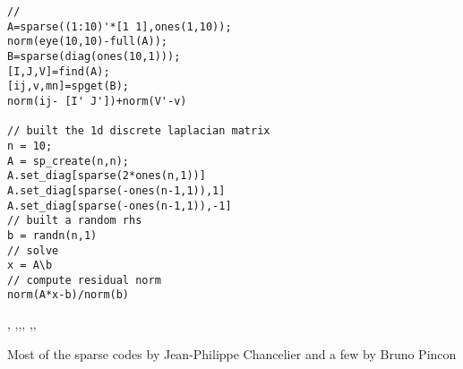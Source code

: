 \begin{examples}
\begin{Verbatim}
//
A=sparse((1:10)'*[1 1],ones(1,10));
norm(eye(10,10)-full(A));
B=sparse(diag(ones(10,1)));
[I,J,V]=find(A);
[ij,v,mn]=spget(B);
norm(ij- [I' J'])+norm(V'-v)

// built the 1d discrete laplacian matrix
n = 10;
A = sp_create(n,n);
A.set_diag[sparse(2*ones(n,1))]
A.set_diag[sparse(-ones(n-1,1)),1]
A.set_diag[sparse(-ones(n-1,1)),-1]
// built a random rhs
b = randn(n,1)
// solve
x = A\b
// compute residual norm
norm(A*x-b)/norm(b)
\end{Verbatim}
\end{examples}

\begin{manseealso}
,
,,,
,,
\end{manseealso}

\begin{authors}
   Most of the sparse codes by Jean-Philippe Chancelier and a few by Bruno Pincon
\end{authors}
